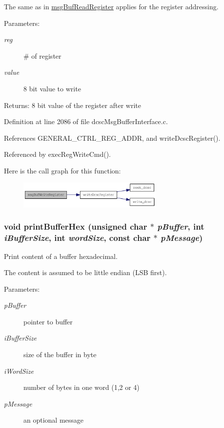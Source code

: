 The same as in \hyperlink{group__dcsc__msg__buffer__access_g7a5b0d57fbd0a68206468a01b0a63520}{msg\-Buf\-Read\-Register} applies for the register addressing. \begin{Desc}
\item[Parameters:]
\begin{description}
\item[{\em reg}]\# of register \item[{\em value}]8 bit value to write \end{description}
\end{Desc}
\begin{Desc}
\item[Returns:]8 bit value of the register after write \end{Desc}


Definition at line 2086 of file dcsc\-Msg\-Buffer\-Interface.c.

References GENERAL\_\-CTRL\_\-REG\_\-ADDR, and write\-Dcsc\-Register().

Referenced by exec\-Reg\-Write\-Cmd().

Here is the call graph for this function:\begin{figure}[H]
\begin{center}
\leavevmode
\includegraphics[width=203pt]{group__dcsc__msg__buffer__access_g82e19c9d34c7ecebcba115d2a6393b6c_cgraph}
\end{center}
\end{figure}
\hypertarget{group__dcsc__msg__buffer__access_g1b3027d209be85e9a8fbd14864c4b442}{
\subsubsection[printBufferHex]{\setlength{\rightskip}{0pt plus 5cm}void print\-Buffer\-Hex (unsigned char $\ast$ {\em p\-Buffer}, int {\em i\-Buffer\-Size}, int {\em word\-Size}, const char $\ast$ {\em p\-Message})}}
\label{group__dcsc__msg__buffer__access_g1b3027d209be85e9a8fbd14864c4b442}


Print content of a buffer hexadecimal. 

The content is assumed to be little endian (LSB first). \begin{Desc}
\item[Parameters:]
\begin{description}
\item[{\em p\-Buffer}]pointer to buffer \item[{\em i\-Buffer\-Size}]size of the buffer in byte \item[{\em i\-Word\-Size}]number of bytes in one word (1,2 or 4) \item[{\em p\-Message}]an optional message \end{description}
\end{Desc}


